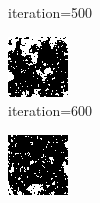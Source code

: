 \documentclass{article}
\begin{document}
\begin{figure}[h]
\begin{subfigure}[t]{0.18\textwidth}
\vspace{-0.6cm}
\caption{iteration=500}
\end{subfigure}\hspace{0.01\textwidth}
\begin{subfigure}[t]{0.18\textwidth}
\centering
\includegraphics[width=\textwidth]{./computational/results/gibbs_node_sampler_negative_iter_600.png}
\vspace{-0.6cm}
\caption{iteration=600}
\end{subfigure}\hspace{0.01\textwidth}
\begin{subfigure}[t]{0.18\textwidth}
\centering
\includegraphics[width=\textwidth]{./computational/results/gibbs_node_sampler_negative_iter_700.png}

\end{subfigure}
\end{figure}
\end{document}
